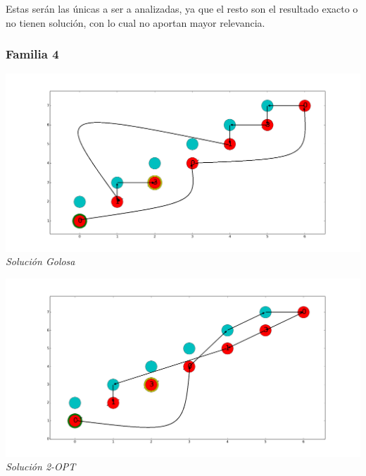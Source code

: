 Estas ser\'an las únicas a ser a analizadas, ya que el resto son el resultado exacto o no tienen soluci\'on, con lo cual no aportan mayor relevancia.
 
\subsubsection*{Familia 4}

\vspace*{0.3cm} \vspace*{0.3cm}
  \begin{center}
 \includegraphics[scale=0.3]{./EJ4/fam4goloso.png}\\
 {            \textit{Soluci\'on Golosa}}
  \end{center}
  \vspace*{0.3cm}

\vspace*{0.3cm} \vspace*{0.3cm}
  \begin{center}
 \includegraphics[scale=0.3]{./EJ4/fam42opt.png}\\
 {            \textit{Soluci\'on 2-OPT}}
  \end{center}
  \vspace*{0.3cm}

